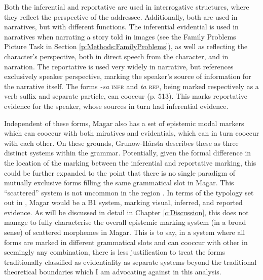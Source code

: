 Both the inferential and reportative are used in interrogative structures, where they reflect the perspective of the addressee. Additionally, both are used in narratives, but with different functions. The inferential evidential is used in narratives when narrating a story told in images (see the Family Problems Picture Task in Section \ref{p:Methods:FamilyProblems}), as well as reflecting the character's perspective, both in direct speech from the character, and in narration. The reportative is used very widely in narrative, but references exclusively speaker perspective, marking the speaker's source of information for the narrative itself. The forms \textit{-sa} \textsc{infr} and \textit{ta} \textsc{rep}, being marked respectively as a verb suffix and separate particle, can cooccur (p. 513). This marks reportative evidence for the speaker, whose sources in turn had inferential evidence.

Independent of these forms, Magar also has a set of epistemic modal markers which can cooccur with both miratives and evidentials, which can in turn cooccur with each other. On these grounds, Grunow-Hårsta describes these as three distinct systems within the grammar. Potentially, given the formal difference in the location of the marking between the inferential and reportative marking, this could be further expanded to the point that there is no single paradigm of mutually exclusive forms filling the same grammatical slot in Magar. This ``scattered'' system is not uncommon in the region \cite[480-481]{GrunowHarsta2008}. In terms of the typology set out in \cite{Aikhenvald2004}, Magar would be a B1 system, marking visual, inferred, and reported evidence. As will be discussed in detail in Chapter \ref{c:Discussion}, this does not manage to fully characterise the overall epistemic marking system (in a broad sense) of scattered morphemes in Magar. This is to say, in a system where all forms are marked in different grammatical slots and can cooccur with other in seemingly any combination, there is less justification to treat the forms traditionally classified as evidentiality as separate systems beyond the traditional theoretical boundaries which I am advocating against in this analysis.

